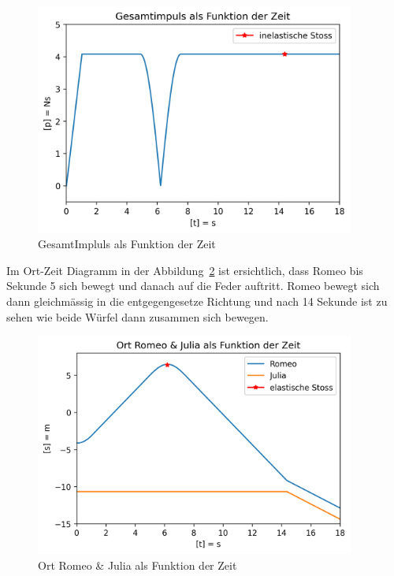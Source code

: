 \documentclass[../main.tex]{subfiles}
\begin{document}
    \begin{figure}[H]
        \begin{center}
            \centerline{\includegraphics[width=105mm]{./images/Inelastisch/GesamtImpluls}}
            \caption{GesamtImpluls als Funktion der Zeit}
            \label{fig:gesamtImpuls}
        \end{center}
    \end{figure}

    \noindent    Im Ort-Zeit Diagramm in der Abbildung~\ref{fig:OrtRomeoJuliaAlsFunktionDerZeit} ist ersichtlich, dass Romeo bis Sekunde 5 sich bewegt und danach auf die Feder auftritt. Romeo bewegt sich dann gleichmässig in die entgegengesetze Richtung und nach 14 Sekunde ist zu sehen wie beide Würfel dann zusammen sich bewegen.
    \begin{figure}[H]
        \begin{center}
            \centerline{\includegraphics[width=105mm]{./images/Inelastisch/OrtRomeoJuliaAlsFunktionDerZeit}}
            \caption{Ort Romeo \& Julia als Funktion der Zeit}
            \label{fig:OrtRomeoJuliaAlsFunktionDerZeit}
        \end{center}
    \end{figure}
\end{document}
